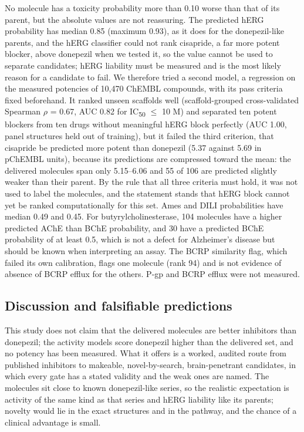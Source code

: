 \documentclass[11pt,a4paper]{article}
\begin{document}
No molecule has a toxicity probability more than 0.10 worse than that of its parent, but the absolute values are not reassuring. The predicted hERG probability has median 0.85 (maximum 0.93), as it does for the donepezil-like parents, and the hERG classifier could not rank cisapride, a far more potent blocker, above donepezil when we tested it, so the value cannot be used to separate candidates; hERG liability must be measured and is the most likely reason for a candidate to fail. We therefore tried a second model, a regression on the measured potencies of 10,470 ChEMBL compounds, with its pass criteria fixed beforehand. It ranked unseen scaffolds well (scaffold-grouped cross-validated Spearman $\rho$ = 0.67, AUC 0.82 for IC\textsubscript{50} $\leq$ 10 \textmu{}M) and separated ten potent blockers from ten drugs without meaningful hERG block perfectly (AUC 1.00, panel structures held out of training), but it failed the third criterion, that cisapride be predicted more potent than donepezil (5.37 against 5.69 in pChEMBL units), because its predictions are compressed toward the mean: the delivered molecules span only 5.15--6.06 and 55 of 106 are predicted slightly weaker than their parent. By the rule that all three criteria must hold, it was not used to label the molecules, and the statement stands that hERG block cannot yet be ranked computationally for this set. Ames and DILI probabilities have median 0.49 and 0.45. For butyrylcholinesterase, 104 molecules have a higher predicted AChE than BChE probability, and 30 have a predicted BChE probability of at least 0.5, which is not a defect for Alzheimer's disease but should be known when interpreting an assay. The BCRP similarity flag, which failed its own calibration, flags one molecule (rank 94) and is not evidence of absence of BCRP efflux for the others. P-gp and BCRP efflux were not measured.

\subsection{Discussion and falsifiable predictions}
\label{sec:discussion}

This study does not claim that the delivered molecules are better inhibitors than donepezil; the activity models score donepezil higher than the delivered set, and no potency has been measured. What it offers is a worked, audited route from published inhibitors to makeable, novel-by-search, brain-penetrant candidates, in which every gate has a stated validity and the weak ones are named. The molecules sit close to known donepezil-like series, so the realistic expectation is activity of the same kind as that series and hERG liability like its parents; novelty would lie in the exact structures and in the pathway, and the chance of a clinical advantage is small.
\end{document}
